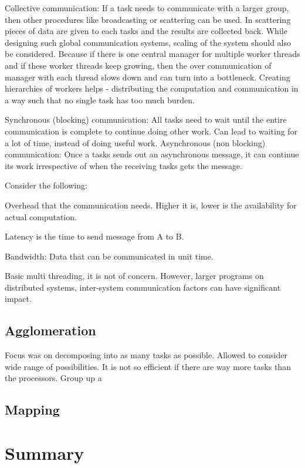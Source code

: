 \documentclass{scrartcl}
\begin{document}
Collective communication: If a task needs to communicate with a larger group, then other procedures like broadcasting or scattering can be used. In scattering pieces of data are given to each tasks and the results are collected back. While designing such global communication systems, scaling of the system should also be considered. Because if there is one central manager for multiple worker threads and if these worker threads keep growing, then the over communication of manager with each thread slows down and can turn into a bottleneck. Creating hierarchies of workers helps - distributing the computation and communication in a way such that no single task has too much burden.

Synchronous (blocking) communication: All tasks need to wait until the entire communication is complete to continue doing other work. Can lead to waiting for a lot of time, instead of doing useful work. 
Asynchronous (non blocking) communication: Once a tasks sends out an asynchronous message, it can continue its work irrespective of when the receiving tasks gets the message.

Consider the following:

Overhead that the communication needs. Higher it is, lower is the availability for actual computation.

Latency is the time to send message from A to B.

Bandwidth: Data that can be communicated in unit time.

Basic multi threading, it is not of concern. However, larger programs on distributed systems, inter-system communication factors can have significant impact.

\subsection{Agglomeration}
Focus was on decomposing into as many tasks as possible. Allowed to consider wide range of possibilities. It is not so efficient if there are way more tasks than the processors. Group up a 


\subsection{Mapping}



\section{Summary}
\end{document}
